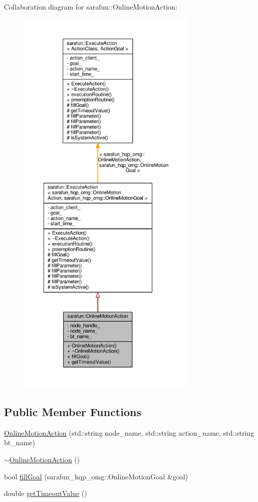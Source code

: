 Collaboration diagram for sarafun\-:\-:Online\-Motion\-Action\-:\nopagebreak
\begin{figure}[H]
\begin{center}
\leavevmode
\includegraphics[height=550pt]{da/d9c/classsarafun_1_1OnlineMotionAction__coll__graph}
\end{center}
\end{figure}
\subsection*{Public Member Functions}
\begin{DoxyCompactItemize}
\item 
\hyperlink{classsarafun_1_1OnlineMotionAction_ab66225e6e9383411dc925e88fb1cf4f9_ab66225e6e9383411dc925e88fb1cf4f9}{Online\-Motion\-Action} (std\-::string node\-\_\-name, std\-::string action\-\_\-name, std\-::string bt\-\_\-name)
\item 
\hyperlink{classsarafun_1_1OnlineMotionAction_a63134a65e9ead7a8250abe2afee5b388_a63134a65e9ead7a8250abe2afee5b388}{$\sim$\-Online\-Motion\-Action} ()
\item 
bool \hyperlink{classsarafun_1_1OnlineMotionAction_aacaa264dad7ba07b5c9a985d66ea48f7_aacaa264dad7ba07b5c9a985d66ea48f7}{fill\-Goal} (sarafun\-\_\-hqp\-\_\-omg\-::\-Online\-Motion\-Goal \&goal)
\item 
double \hyperlink{classsarafun_1_1OnlineMotionAction_a453e7dca41a0d73b5297ce191e760b31_a453e7dca41a0d73b5297ce191e760b31}{get\-Timeout\-Value} ()
\end{DoxyCompactItemize}
